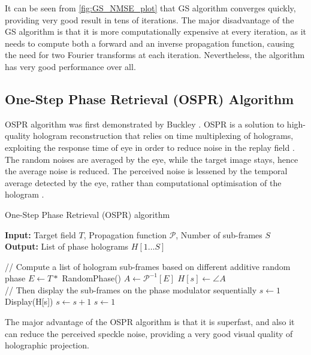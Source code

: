 It can be seen from \cref{fig:GS_NMSE_plot} that GS algorithm converges quickly, providing very good result in tens of iterations. The major disadvantage of the GS algorithm is that it is more computationally expensive at every iteration, as it needs to compute both a forward and an inverse propagation function, causing the need for two Fourier transforms at each iteration. Nevertheless, the algorithm has very good performance over all.


\subsection{One-Step Phase Retrieval (OSPR) Algorithm}\label{sec:One Step Phase Retrieval (OSPR) Algorithm}
OSPR algorithm was first demonstrated by Buckley \cite{Buckley2006}. OSPR is a solution to high-quality hologram reconstruction that relies on time multiplexing of holograms, exploiting the response time of eye in order to reduce noise in the replay field \cite{Cable2006}. The random noises are averaged by the eye, while the target image stays, hence the average noise is reduced. The perceived noise is lessened by the temporal average detected by the eye, rather than computational optimisation of the hologram \cite{Cable2006}.
\begin{algorithm}[H]
  \caption{One-Step Phase Retrieval (OSPR) algorithm}\label{alg:One Step Phase Retrieval (OSPR) Algorithm}
  \textbf{Input:} Target field $T$, Propagation function $\mathcal{P}$, Number of sub-frames $S$ \\
  \textbf{Output:} List of phase holograms $H[1\ldots S]$
  \begin{algorithmic}
    \State // Compute a list of hologram sub-frames based on different additive random phase
    \State $E \gets T * $ RandomPhase()
    \State $A \gets \mathcal{P}^{-1}[E]$
    \State $H[s] \gets \angle A$
    \EndFor\\
    \State // Then display the sub-frames on the phase modulator sequentially
    \State $s\gets 1$
    \State Display(H[s])
    \State $s\gets s + 1$
    \State $s\gets 1$
    \EndIf
    \EndWhile
  \end{algorithmic}
\end{algorithm}

The major advantage of the OSPR algorithm is that it is superfast, and also it can reduce the perceived speckle noise, providing a very good visual quality of holographic projection.


